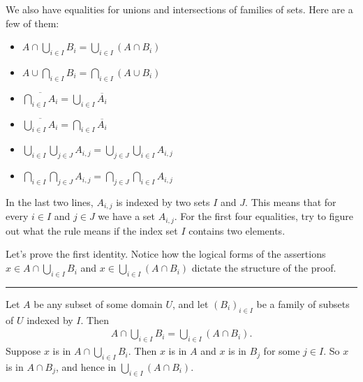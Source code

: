 \documentclass[letterpaper,10pt,english]{sphinxmanual}
\begin{document}
\sphinxAtStartPar
We also have equalities for unions and intersections of families of sets. Here are a few of them:
\begin{itemize}
\item {} 
\sphinxAtStartPar
\(A \cap \bigcup_{i \in I} B_i = \bigcup_{i \in I} (A \cap B_i)\)

\item {} 
\sphinxAtStartPar
\(A \cup \bigcap_{i \in I} B_i = \bigcap_{i \in I} (A \cup B_i)\)

\item {} 
\sphinxAtStartPar
\(\overline{\bigcap_{i \in I} A_i} = \bigcup_{i \in I} \overline{A_i}\)

\item {} 
\sphinxAtStartPar
\(\overline{\bigcup_{i \in I} A_i} = \bigcap_{i \in I} \overline{A_i}\)

\item {} 
\sphinxAtStartPar
\(\bigcup_{i \in I} \bigcup_{j \in J} A_{i,j} = \bigcup_{j \in J} \bigcup_{i \in I} A_{i,j}\)

\item {} 
\sphinxAtStartPar
\(\bigcap_{i \in I} \bigcap_{j \in J} A_{i,j} = \bigcap_{j \in J} \bigcap_{i \in I} A_{i,j}\)

\end{itemize}

\sphinxAtStartPar
In the last two lines, \(A_{i,j}\) is indexed by two sets \(I\) and \(J\). This means that for every \(i \in I\) and \(j\in J\) we have a set \(A_{i,j}\). For the first four equalities, try to figure out what the rule means if the index set \(I\) contains two elements.

\sphinxAtStartPar
Let’s prove the first identity. Notice how the logical forms of the assertions \(x \in A \cap \bigcup_{i \in I} B_i\) and \(x \in \bigcup_{i \in I} (A \cap B_i)\) dictate the structure of the proof.


\bigskip\hrule\bigskip


\sphinxAtStartPar
{} Let \(A\) be any subset of some domain \(U\), and let \((B_i)_{i \in I}\) be a family of subsets of \(U\) indexed by \(I\). Then
\begin{equation*}
\begin{split}A \cap \bigcup_{i \in I} B_i = \bigcup_{i \in I} (A \cap B_i).\end{split}
\end{equation*}
\sphinxAtStartPar
{} Suppose \(x\) is in \(A \cap \bigcup_{i \in I} B_i\). Then \(x\) is in \(A\) and \(x\) is in \(B_j\) for some \(j \in I\). So \(x\) is in \(A \cap B_j\), and hence in \(\bigcup_{i \in I} (A \cap B_i)\).
\end{document}
